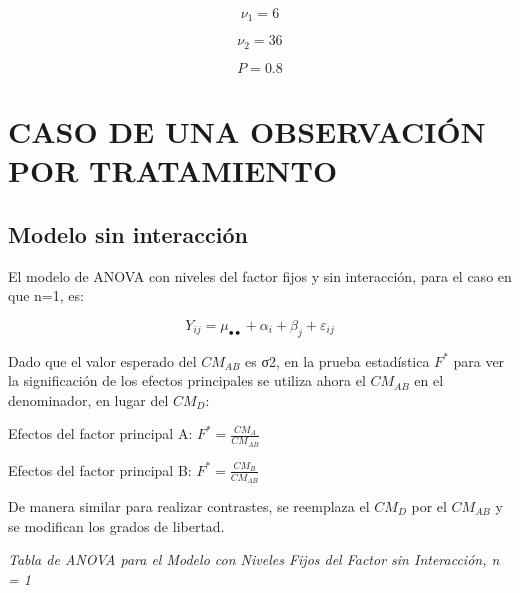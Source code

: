 \documentclass[]{book}
\theoremstyle{definition}
\theoremstyle{definition}
\theoremstyle{definition}
\theoremstyle{remark}
\begin{document}
\[
\nu_{1} = 6
\]

\[
\nu_{2} = 36
\]

\[
P = 0.8
\]

\hypertarget{caso-de-una-observacion-por-tratamiento}{%
\section{CASO DE UNA OBSERVACIÓN POR
TRATAMIENTO}\label{caso-de-una-observacion-por-tratamiento}}

\hypertarget{modelo-sin-interaccion}{%
\subsection{Modelo sin interacción}\label{modelo-sin-interaccion}}

El modelo de ANOVA con niveles del factor fijos y sin interacción, para
el caso en que n=1, es:

\[
Y_{ij} = \mu_{\bullet \bullet} + \alpha_{i} + \beta_{j} + \varepsilon_{ij}
\]

Dado que el valor esperado del \(CM_{AB}\) es σ2, en la prueba
estadística \(F^{*}\) para ver la significación de los efectos
principales se utiliza ahora el \(CM_{AB}\) en el denominador, en lugar
del \(CM_{D}\):

Efectos del factor principal A: \(F^{*} = \frac{CM_{A}}{CM_{AB}}\)

Efectos del factor principal B: \(F^{*} = \frac{CM_{B}}{CM_{AB}}\)

De manera similar para realizar contrastes, se reemplaza el \(CM_{D}\)
por el \(CM_{AB}\) y se modifican los grados de libertad.

\emph{Tabla de ANOVA para el Modelo con Niveles Fijos del Factor sin
Interacción, n = 1}
\end{document}
